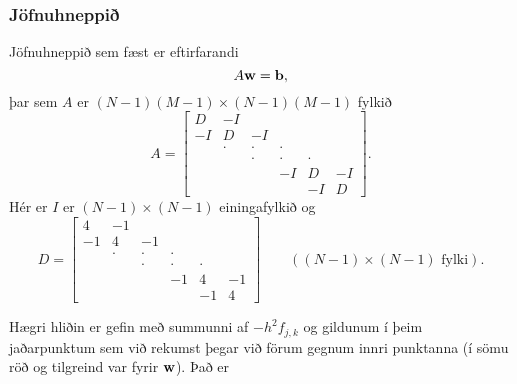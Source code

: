 \documentclass[icelandic,a4paper,12pt]{article}
\begin{document}
\subsubsection{Jöfnuhneppið}
Jöfnuhneppið sem fæst er eftirfarandi
$$
A\mbox{${\bf w}$} = \mbox{${\bf b}$},
$$ 
þar sem $A$ er $(N-1)(M-1)\times (N-1)(M-1)$ fylkið
$$
  A = \left[\begin{array}{cccccc}
D & -I &   &   &   &  \\
-I & D & -I &   &   &  \\
  & \cdot & \cdot & \cdot &   &  \\
  &   & \cdot & \cdot & \cdot &  \\
  &   &  & -I & D & -I\\
  &   &   &   & -I & D
      \end{array}\right].
$$
Hér er $I$ er $(N-1)\times (N-1)$ einingafylkið og 
$$
  D = \left[\begin{array}{cccccc}
4 & -1 &   &   &   &  \\
-1 & 4 & -1 &   &   &  \\
  & \cdot & \cdot & \cdot &   &  \\
  &   & \cdot & \cdot & \cdot &  \\
  &   &  & -1 & 4 & -1\\
  &   &   &   & -1 & 4
      \end{array}\right] \qquad ((N-1)\times (N-1) \text{ fylki}).
$$


Hægri hliðin er gefin með summunni af $-h^2 f_{j,k}$ og gildunum í þeim
jaðarpunktum sem við rekumst þegar við förum gegnum innri punktanna
(í sömu röð og tilgreind var fyrir $\mbox{${\bf w}$}$). \pause Það er
\end{document}

